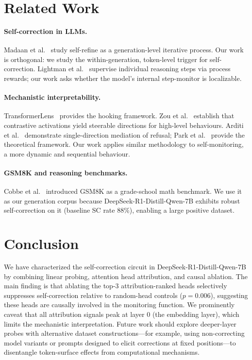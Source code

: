 \documentclass{article}
\begin{document}
\section{Related Work}
\label{sec:related}

\paragraph{Self-correction in LLMs.}
Madaan et al.~\citep{madaan2023selfrefine} study self-refine as a generation-level iterative process.
Our work is orthogonal: we study the within-generation, token-level trigger for self-correction.
Lightman et al.~\citep{lightman2023let} supervise individual reasoning steps via process rewards; our work asks whether the model's internal step-monitor is localizable.

\paragraph{Mechanistic interpretability.}
TransformerLens~\citep{nanda2022transformerlens} provides the hooking framework.
Zou et al.~\citep{zou2023representation} establish that contrastive activations yield steerable directions for high-level behaviours.
Arditi et al.~\citep{arditi2024refusal} demonstrate single-direction mediation of refusal; Park et al.~\citep{park2024linear} provide the theoretical framework.
Our work applies similar methodology to self-monitoring, a more dynamic and sequential behaviour.

\paragraph{GSM8K and reasoning benchmarks.}
Cobbe et al.~\citep{cobbe2021gsm8k} introduced GSM8K as a grade-school math benchmark.
We use it as our generation corpus because DeepSeek-R1-Distill-Qwen-7B exhibits robust self-correction on it (baseline SC rate 88\%), enabling a large positive dataset.

\section{Conclusion}
\label{sec:conclusion}

We have characterized the self-correction circuit in DeepSeek-R1-Distill-Qwen-7B by combining linear probing, attention head attribution, and causal ablation.
The main finding is that ablating the top-3 attribution-ranked heads selectively suppresses self-correction relative to random-head controls ($p = 0.006$), suggesting these heads are causally involved in the monitoring function.
We prominently caveat that all attribution signals peak at layer 0 (the embedding layer), which limits the mechanistic interpretation.
Future work should explore deeper-layer probes with alternative dataset constructions---for example, using non-correcting model variants or prompts designed to elicit corrections at fixed positions---to disentangle token-surface effects from computational mechanisms.
\end{document}
